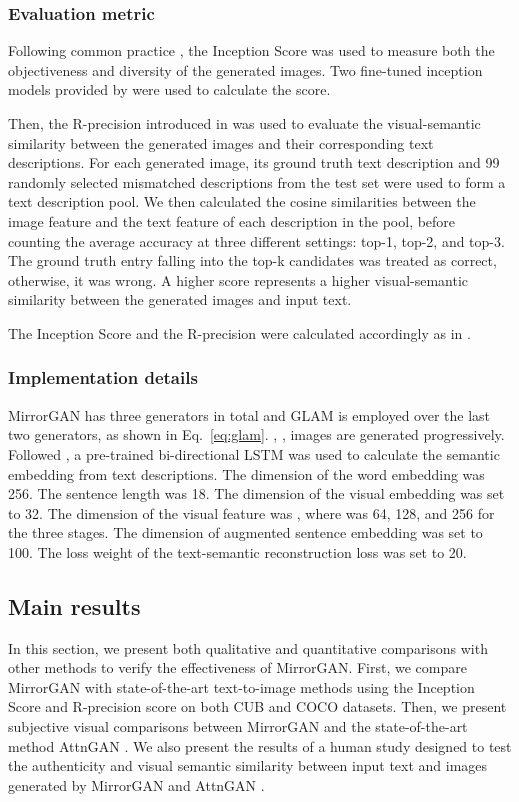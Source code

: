 \documentclass[10pt,twocolumn,letterpaper]{article}
\begin{document}
\subsubsection{Evaluation metric}
Following common practice \cite{zhang2017stackgan,xu2017attngan}, the Inception Score \cite{salimans2016improved} was used to measure both the objectiveness and diversity of the generated images. Two fine-tuned inception models provided by \cite{zhang2017stackgan} were used to calculate the score.

Then, the R-precision introduced in \cite{xu2017attngan} was used to evaluate the visual-semantic similarity between the generated images and their corresponding text descriptions. For each generated image, its ground truth text description and 99 randomly selected mismatched descriptions from the test set were used to form a text description pool. We then calculated the cosine similarities between the image feature and the text feature of each description in the pool, before counting the average accuracy at three different settings: top-1, top-2, and top-3. The ground truth entry falling into the top-k candidates was treated as correct, otherwise, it was wrong. A higher score represents a higher visual-semantic similarity between the generated images and input text. 

The Inception Score and the R-precision were calculated accordingly as in \cite{zhang2017stackgan,xu2017attngan}.
\subsubsection{Implementation details}
MirrorGAN has three generators in total and GLAM is employed over the last two generators, as shown in Eq.~\eqref{eq:glam}. , ,  images are generated progressively. Followed \cite{xu2017attngan}, a pre-trained bi-directional LSTM \cite{schuster1997bidirectional} was used to calculate the semantic embedding from text descriptions. The dimension of the word embedding  was 256. The sentence length  was 18. The dimension  of the visual embedding was set to 32. The dimension of the visual feature was , where  was 64, 128, and 256 for the three stages. The dimension of augmented sentence embedding  was set to 100. The loss weight  of the text-semantic reconstruction loss was set to 20.

\subsection{Main results}
In this section, we present both qualitative and quantitative comparisons with other methods to verify the effectiveness of MirrorGAN. First, we compare MirrorGAN with state-of-the-art text-to-image methods \cite{reed2016generative,reed2016learning,zhang2017stackgan,zhang2017stackgan++,nguyen2017plug,xu2017attngan} using the Inception Score and R-precision score on both CUB and COCO datasets. Then, we present subjective visual comparisons between MirrorGAN and the state-of-the-art method AttnGAN \cite{xu2017attngan}. We also present the results of a human study designed to test the authenticity and visual semantic similarity between input text and images generated by MirrorGAN and AttnGAN \cite{xu2017attngan}.
\end{document}
